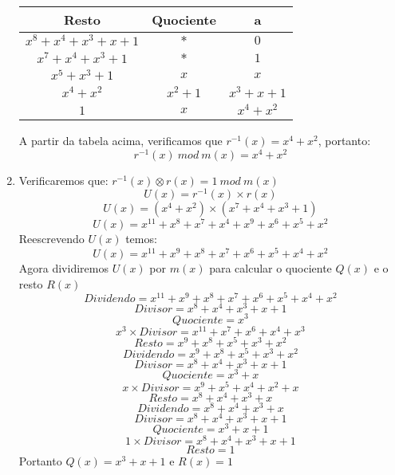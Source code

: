 \documentclass[12pt]{article}
\begin{document}
\begin{enumerate}
\begin{table}[h]
		\begin{tabular}{c|c|c}
			Resto & Quociente & a \\
		\hline                               
			$x^8 + x^4 + x^3 + x + 1$ & $*$                & $0$ \\
			$x^7 + x^4 + x^3 + 1$      & $*$                & $1$ \\
			$x^5 + x^3 + 1$               & $x$                & $x$ \\	
			$x^4 + x^2$                    & $x^2 + 1$       & $x^3 + x + 1$ \\
			$1$                                 & $x$               & $x^4 + x^2$\\
		\end{tabular}
		\end{table}
		\newpage						
		A partir da tabela acima, verificamos que $r^{-1}(x) = x^4 + x^2$, portanto: 
		$$r^{-1}(x)  \ mod \ m(x) = x^4 + x^2$$
	\item
		Verificaremos que: $r^{-1}(x) \otimes r(x) = 1 \ mod \ m(x) $
		$$U(x) = r^{-1}(x) \times r(x)$$
		$$U(x) = (x^4 + x^2) \times (x^7 + x^4 + x^3 + 1)$$
		$$U(x) = x^{11} + x^8 + x^7 + x^4 + x^9 + x^6 + x^5 + x^2$$
		Reescrevendo $U(x)$ temos:
		$$U(x) = x^{11} + x^9 + x^8 + x^7 + x^6 + x^5 + x^4 + x^2$$
		Agora dividiremos $U(x)$ por $m(x)$ para calcular o quociente $Q(x)$ e o resto $R(x)$
		\subitem	
			$$Dividendo = x^{11} + x^9 + x^8 + x^7 + x^6 + x^5 + x^4 + x^2$$
			$$Divisor = x^8 + x^4 + x^3 + x + 1 $$
			$$Quociente = x^3$$
			$$x^3 \times Divisor = x^{11} + x^7 + x^6 + x^4 + x^3$$
			$$Resto = x^9 + x^8 + x^5 + x^3 + x^2$$	
		\subitem	
			$$Dividendo = x^9 + x^8 + x^5 + x^3 + x^2$$
			$$Divisor = x^8 + x^4 + x^3 + x + 1 $$
			$$Quociente = x^3 + x$$
			$$x \times Divisor = x^9 + x^5 + x^4 + x^2 + x$$
			$$Resto = x^8 + x^4 + x^3 + x$$	
		\subitem	
			$$Dividendo = x^8 + x^4 + x^3 + x$$
			$$Divisor = x^8 + x^4 + x^3 + x + 1 $$
			$$Quociente = x^3 + x + 1$$
			$$1 \times Divisor = x^8 + x^4 + x^3 + x + 1$$
			$$Resto = 1$$
		Portanto $Q(x) = x^3 + x + 1$ e $R(x) = 1$	
	\end{enumerate}
\end{document}
